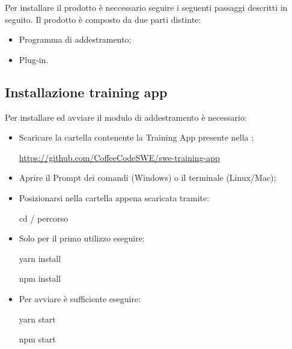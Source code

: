 \documentclass[../manuale-utente.tex]{subfiles}
\begin{document}
Per installare il prodotto è neccessario seguire i seguenti passaggi descritti in seguito. Il prodotto è composto da due parti distinte:
\begin{itemize}
  \item Programma di addestramento;
  \item Plug-in.
\end{itemize}

\subsection{Installazione training app}
\label{subs:installazione-training-app}
Per installare ed avviare il modulo di addestramento è necessario:
\begin{itemize}
  \item Scaricare la cartella contenente la Training App presente nella : \\
  \centerline{\url{https://github.com/CoffeeCodeSWE/swe-training-app}}
  \item Aprire il Prompt dei comandi (Windows) o il terminale (Linux/Mac);
  \item Posizionarsi nella cartella appena scaricata tramite: \\
  \centerline{cd / percorso}
  \item Solo per il primo utilizzo eseguire: \\
  \centerline{yarn install}
  \centerline{npm install}
  \item Per avviare è sufficiente eseguire: \\
  \centerline{yarn start}
  \centerline{npm start}
\end{itemize}
\end{document}
